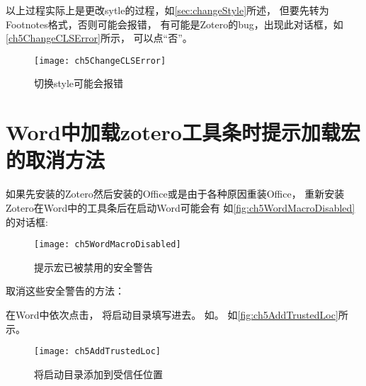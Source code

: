 \documentclass[cn,11pt,chinese]{elegantbook}
\begin{document}
	    			
					以上过程实际上是更改sytle的过程，如\cref{sec:changeStyle}所述，
					但要先转为Footnotes格式，否则可能会报错，
					有可能是Zotero的bug，出现此对话框，如\autoref{ch5ChangeCLSError}所示，
					可以点“否”。
	    			\begin{figure}[ht]
	    				\centering
	    				\texttt{[image: ch5ChangeCLSError]}
	    				\caption{切换style可能会报错}
	    				\label{ch5ChangeCLSError}
	    			\end{figure}
    			
	    \section{Word中加载zotero工具条时提示加载宏的取消方法}\label{sec:load_mac}
			如果先安装的Zotero然后安装的Office或是由于各种原因重装Office，
			重新安装Zotero在Word中的工具条后在启动Word可能会有
			如\autoref{fig:ch5WordMacroDisabled}的对话框:
	    	\begin{figure}[htbp]
	    		\centering
	    		\texttt{[image: ch5WordMacroDisabled]}
	    		\caption{提示宏已被禁用的安全警告}
	    		\label{fig:ch5WordMacroDisabled}
	    	\end{figure}
	       	
	      取消这些安全警告的方法：
    	
		在Word中依次点击，
		将启动目录填写进去。    	
		如。
		如\autoref{fig:ch5AddTrustedLoc}所示。
	    		\begin{figure}[ht]
					\centering
					\texttt{[image: ch5AddTrustedLoc]}
					\caption{将启动目录添加到受信任位置}
					\label{fig:ch5AddTrustedLoc}
	    		\end{figure}
\end{document}
